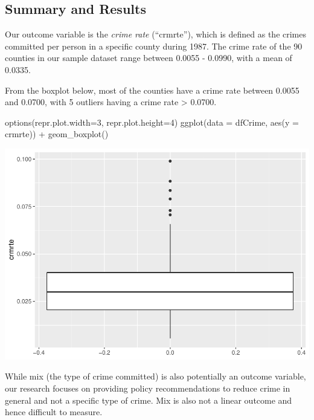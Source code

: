 \documentclass[]{article}
\newenvironment{Shaded}{}{}
\newcommand{\DataTypeTok}[1]{#1}
\newcommand{\DecValTok}[1]{#1}
\newcommand{\KeywordTok}[1]{\textcolor[rgb]{0.00,0.00,1.00}{#1}}
\newcommand{\NormalTok}[1]{#1}
\newcommand{\OperatorTok}[1]{#1}
\newcommand{\StringTok}[1]{\textcolor[rgb]{0.00,0.50,0.50}{#1}}
\begin{document}
\hypertarget{summary-and-results}{%
\subsection{Summary and Results}\label{summary-and-results}}

Our outcome variable is the \emph{crime rate} (``crmrte''), which is
defined as the crimes committed per person in a specific county during
1987. The crime rate of the 90 counties in our sample dataset range
between 0.0055 - 0.0990, with a mean of 0.0335.

From the boxplot below, most of the counties have a crime rate between
0.0055 and 0.0700, with 5 outliers having a crime rate \textgreater{}
0.0700.

\begin{Shaded}
\begin{Highlighting}[]
\KeywordTok{options}\NormalTok{(}\DataTypeTok{repr.plot.width=}\DecValTok{3}\NormalTok{, }\DataTypeTok{repr.plot.height=}\DecValTok{4}\NormalTok{)}
\KeywordTok{ggplot}\NormalTok{(}\DataTypeTok{data =}\NormalTok{ dfCrime, }\KeywordTok{aes}\NormalTok{(}\DataTypeTok{y =}\NormalTok{ crmrte)) }\OperatorTok{+}\StringTok{ }
\StringTok{      }\KeywordTok{geom_boxplot}\NormalTok{()}
\end{Highlighting}
\end{Shaded}

\includegraphics{Bagnard_Gaustad_Hartman_Leung_Lab_3_files/figure-latex/unnamed-chunk-59-1.pdf}

While mix (the type of crime committed) is also potentially an outcome
variable, our research focuses on providing policy recommendations to
reduce crime in general and not a specific type of crime. Mix is also
not a linear outcome and hence difficult to measure.
\end{document}
